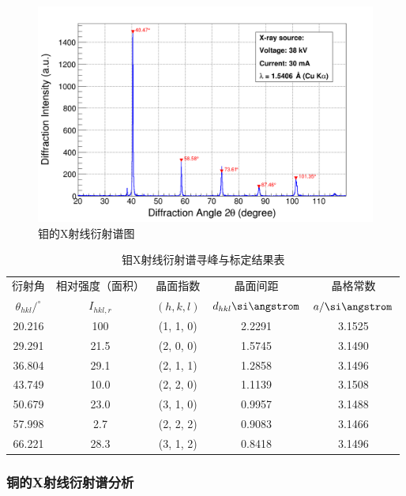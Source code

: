 \documentclass{thuemp}
\begin{document}
\begin{figure}[H]
    \centering
    \includegraphics[width=0.8\linewidth]{../Data/Mo-multi.png}
    \caption{钼的X射线衍射谱图}
    \label{fig:mo_xrd}
\end{figure}

\begin{table}
    \centering
    \captionnamefont{\wuhao\bf\heiti}
    \captiontitlefont{\wuhao\bf\heiti}
    \caption{钼X射线衍射谱寻峰与标定结果表}
    \label{tab:mo_xrd}
    \liuhao
    \begin{tabular}{ccccc}
        \toprule
        衍射角 & 相对强度（面积）& 晶面指数 & 晶面间距 & 晶格常数 \\
        $\theta_{hkl}/^\circ$ & $I_{hkl,r}$ & $(h,k,l)$ & $d_{hkl}\text{\si\angstrom}$ & $a/\text{\si\angstrom}$\\
        \midrule
        20.216 &  100 & (1, 1, 0) & 2.2291 & 3.1525 \\
        29.291 & 21.5 & (2, 0, 0) & 1.5745 & 3.1490 \\
        36.804 & 29.1 & (2, 1, 1) & 1.2858 & 3.1496 \\
        43.749 & 10.0 & (2, 2, 0) & 1.1139 & 3.1508 \\
        50.679 & 23.0 & (3, 1, 0) & 0.9957 & 3.1488 \\
        57.998 &  2.7 & (2, 2, 2) & 0.9083 & 3.1466 \\
        66.221 & 28.3 & (3, 1, 2) & 0.8418 & 3.1496 \\
        \bottomrule
    \end{tabular}
\end{table}

\subsubsection{铜的X射线衍射谱分析}
\end{document}
